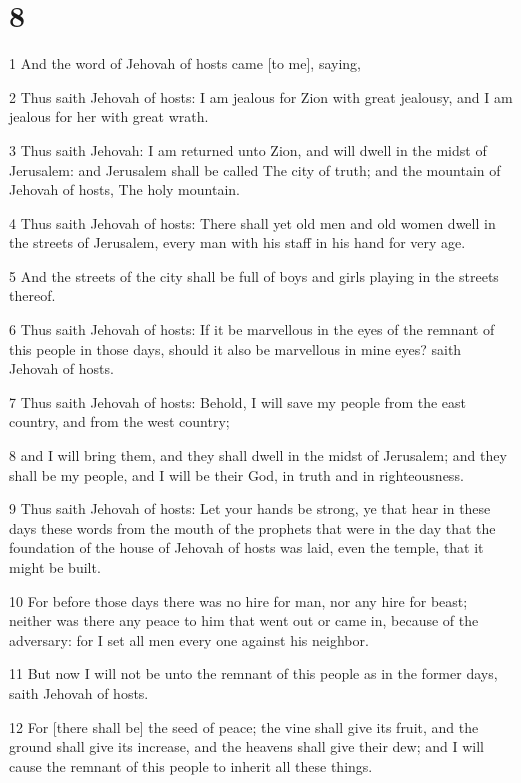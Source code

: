 \chapter{8}

\par 1 And the word of Jehovah of hosts came [to me], saying,
\par 2 Thus saith Jehovah of hosts: I am jealous for Zion with great jealousy, and I am jealous for her with great wrath.
\par 3 Thus saith Jehovah: I am returned unto Zion, and will dwell in the midst of Jerusalem: and Jerusalem shall be called The city of truth; and the mountain of Jehovah of hosts, The holy mountain.
\par 4 Thus saith Jehovah of hosts: There shall yet old men and old women dwell in the streets of Jerusalem, every man with his staff in his hand for very age.
\par 5 And the streets of the city shall be full of boys and girls playing in the streets thereof.
\par 6 Thus saith Jehovah of hosts: If it be marvellous in the eyes of the remnant of this people in those days, should it also be marvellous in mine eyes? saith Jehovah of hosts.
\par 7 Thus saith Jehovah of hosts: Behold, I will save my people from the east country, and from the west country;
\par 8 and I will bring them, and they shall dwell in the midst of Jerusalem; and they shall be my people, and I will be their God, in truth and in righteousness.
\par 9 Thus saith Jehovah of hosts: Let your hands be strong, ye that hear in these days these words from the mouth of the prophets that were in the day that the foundation of the house of Jehovah of hosts was laid, even the temple, that it might be built.
\par 10 For before those days there was no hire for man, nor any hire for beast; neither was there any peace to him that went out or came in, because of the adversary: for I set all men every one against his neighbor.
\par 11 But now I will not be unto the remnant of this people as in the former days, saith Jehovah of hosts.
\par 12 For [there shall be] the seed of peace; the vine shall give its fruit, and the ground shall give its increase, and the heavens shall give their dew; and I will cause the remnant of this people to inherit all these things.
